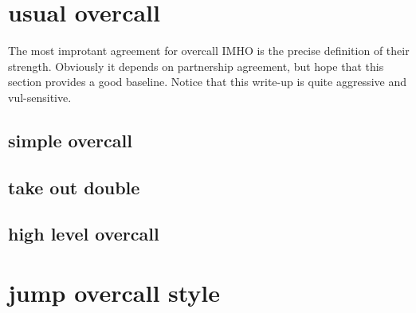 \section{usual overcall}

The most improtant agreement for overcall IMHO is the precise definition of their strength.
Obviously it depends on partnership agreement, but hope that this section provides a good baseline.
Notice that this write-up is quite aggressive and vul-sensitive.

\subsection{simple overcall}

\subsection{take out double}


\subsection{high level overcall}


\section{jump overcall style}

